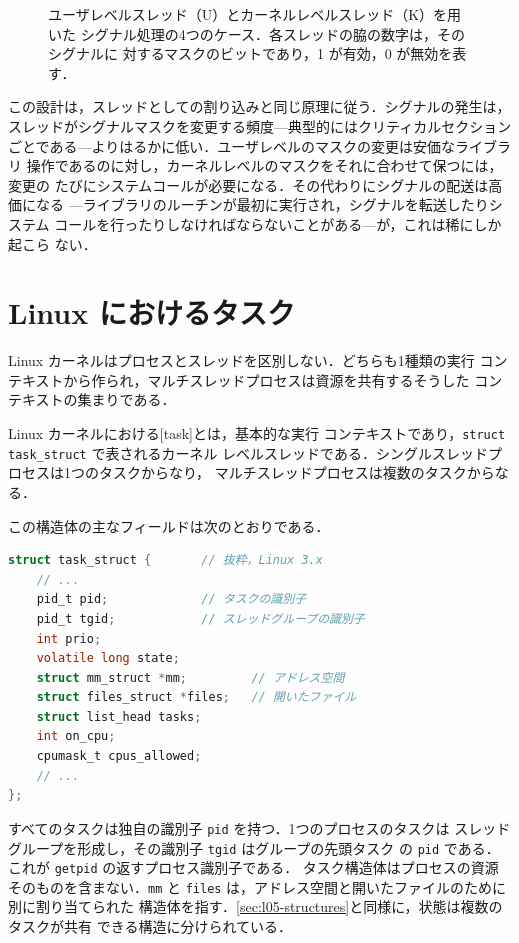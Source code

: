 \documentclass[../main.tex]{subfiles}
\begin{document}
\begin{figure}[htbp]
  \centering
  
  \caption{ユーザレベルスレッド（U）とカーネルレベルスレッド（K）を用いた
    シグナル処理の4つのケース．各スレッドの脇の数字は，そのシグナルに
    対するマスクのビットであり，1 が有効，0 が無効を表す．}
  \label{fig:l05-signal-cases}
\end{figure}

この設計は，スレッドとしての割り込みと同じ原理に従う．シグナルの発生は，
スレッドがシグナルマスクを変更する頻度---典型的にはクリティカルセクション
ごとである---よりはるかに低い．ユーザレベルのマスクの変更は安価なライブラリ
操作であるのに対し，カーネルレベルのマスクをそれに合わせて保つには，変更の
たびにシステムコールが必要になる．その代わりにシグナルの配送は高価になる
---ライブラリのルーチンが最初に実行され，シグナルを転送したりシステム
コールを行ったりしなければならないことがある---が，これは稀にしか起こら
ない．

\section{Linux におけるタスク}
\label{sec:l05-linux}

Linux カーネルはプロセスとスレッドを区別しない．どちらも1種類の実行
コンテキストから作られ，マルチスレッドプロセスは資源を共有するそうした
コンテキストの集まりである．

\begin{definition}[タスク]
  Linux カーネルにおける[task]とは，基本的な実行
  コンテキストであり，\texttt{struct task\_struct} で表されるカーネル
  レベルスレッドである．シングルスレッドプロセスは1つのタスクからなり，
  マルチスレッドプロセスは複数のタスクからなる．
\end{definition}

この構造体の主なフィールドは次のとおりである．
\begin{lstlisting}[language=C, numbers=none]
struct task_struct {       // 抜粋，Linux 3.x
    // ...
    pid_t pid;             // タスクの識別子
    pid_t tgid;            // スレッドグループの識別子
    int prio;
    volatile long state;
    struct mm_struct *mm;         // アドレス空間
    struct files_struct *files;   // 開いたファイル
    struct list_head tasks;
    int on_cpu;
    cpumask_t cpus_allowed;
    // ...
};
\end{lstlisting}
すべてのタスクは独自の識別子 \texttt{pid} を持つ．1つのプロセスのタスクは
スレッドグループを形成し，その識別子 \texttt{tgid} はグループの先頭タスク
の \texttt{pid} である．これが \texttt{getpid} の返すプロセス識別子である．%
タスク構造体はプロセスの資源そのものを含まない．\texttt{mm} と
\texttt{files} は，アドレス空間と開いたファイルのために別に割り当てられた
構造体を指す．\cref{sec:l05-structures}と同様に，状態は複数のタスクが共有
できる構造に分けられている．
\end{document}
